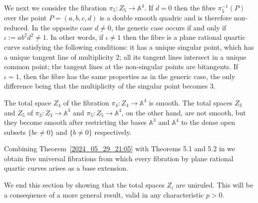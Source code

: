 \documentclass[12pt,reqno]{amsart}
\newtheorem{thm}{Theorem}[section]
\theoremstyle{definition}
\newcommand{\su}{\subset}
\newcommand{\PP}{\mathbb{P}}
\newcommand{\AAA}{\mathbb{A}}
\begin{document}
We next we consider the fibration $\pi_5:Z_5\to \AAA^4$.
If $d=0$ then the fibre $\pi_5^{-1}(P)$ over the point $P=(a,b,c,d)$ is a double smooth quadric and is therefore non-reduced.
In the opposite case $d\neq0$, the generic case occurs if and only if 
$\iota := ab^2 d^{2}\neq 1$.
In other words, if $\iota \neq 1$ then the fibre is a plane rational quartic curve satisfying the following conditions: it has a unique singular point, which has a unique tangent line of multiplicity 2; all its tangent lines intersect in a unique common point; the tangent lines at the non-singular points are bitangents.
If $\iota = 1$, then the fibre has the same properties as in the generic case, the only difference being that the multiplicity of the singular point becomes 3.

The total space $Z_4$ of the fibration $\pi_4:Z_4\to \AAA^4$ is smooth. 
The total spaces $Z_3$ and $Z_5$ of $\pi_3:Z_3\to \AAA^3$ and $\pi_5:Z_5\to \AAA^4$, on the other hand, are not smooth, but they become smooth after restricting the bases $\AAA^3$ and $\AAA^4$ to the dense open subsets $\{ bc \neq 0\}$ and $\{ b\neq 0 \}$ respectively.

Combining Theorem~\ref{2024_05_29_21:05} with Theorems 5.1 and 5.2 in \cite{HiSt23} we obtain five universal fibrations from which every fibration by plane rational quartic curves arises as a base extension.


We end this section by showing that the total spaces $Z_i$ are uniruled.
This will be a consequence of a more general result, valid in any characteristic $p>0$.
\end{document}
